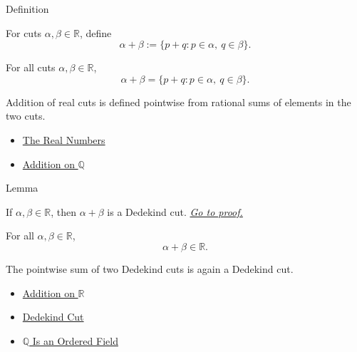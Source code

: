 \begin{definitionbox}{Definition}
\begin{definition}
\label{def:addition-on-r}
For cuts $\alpha,\beta\in\mathbb{R}$, define
\[
\alpha+\beta:=\{p+q:p\in\alpha,\ q\in\beta\}.
\]
\end{definition}
\end{definitionbox}

\begin{remark*}
For all cuts $\alpha,\beta\in\mathbb{R}$,
\[
\alpha+\beta=\{p+q:p\in\alpha,\ q\in\beta\}.
\]
\end{remark*}

\begin{remark*}[Interpretation]
Addition of real cuts is defined pointwise from rational sums of elements in
the two cuts.
\end{remark*}

\begin{dependencies}
\begin{itemize}
  \item \hyperref[def:reals]{The Real Numbers}
  \item \hyperref[def:addition-on-q-classes]{Addition on $\mathbb{Q}$}
\end{itemize}
\end{dependencies}

\begin{lemmabox}{Lemma}
\begin{lemma}
\label{lem:sum-of-cuts-is-a-cut}
If $\alpha,\beta\in\mathbb{R}$, then $\alpha+\beta$ is a Dedekind cut.
\hyperref[prf:sum-of-cuts-is-a-cut]{\textit{Go to proof.}}
\end{lemma}
\end{lemmabox}

\begin{remark*}
For all $\alpha,\beta\in\mathbb{R}$,
\[
\alpha+\beta\in\mathbb{R}.
\]
\end{remark*}

\begin{remark*}[Interpretation]
The pointwise sum of two Dedekind cuts is again a Dedekind cut.
\end{remark*}

\begin{dependencies}
\begin{itemize}
  \item \hyperref[def:addition-on-r]{Addition on $\mathbb{R}$}
  \item \hyperref[def:dedekind-cut]{Dedekind Cut}
  \item \hyperref[thm:q-is-an-ordered-field]{$\mathbb{Q}$ Is an Ordered Field}
\end{itemize}
\end{dependencies}

